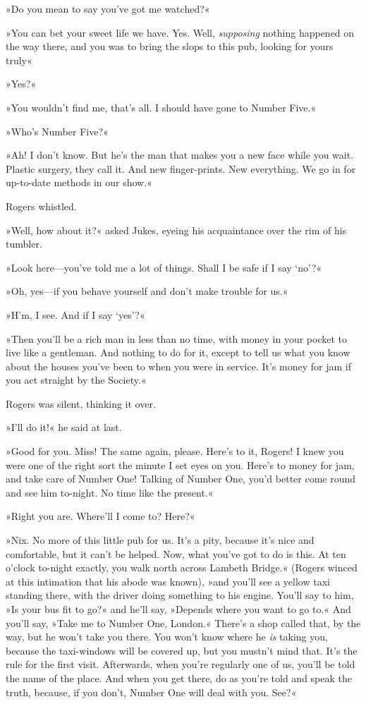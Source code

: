 »Do you mean to say you've got me watched?«

»You can bet your sweet life we have. Yes. Well, \textit{supposing} nothing happened on the way there, and you was to bring the slops to this pub, looking for yours truly\longdash«

»Yes?«

»You wouldn't find me, that's all. I should have gone to Number Five.«

»Who's Number Five?«

»Ah! I don't know. But he's the man that makes you a new face while you wait. Plastic surgery, they call it. And new finger-prints. New everything. We go in for up-to-date methods in our show.«

Rogers whistled.

»Well, how about it?« asked Jukes, eyeing his acquaintance over the rim of his tumbler.

»Look here—you've told me a lot of things. Shall I be safe if I say `no'?«

»Oh, yes—if you behave yourself and don't make trouble for us.«

»H'm, I see. And if I say `yes'?«

»Then you'll be a rich man in less than no time, with money in your pocket to live like a gentleman. And nothing to do for it, except to tell us what you know about the houses you've been to when you were in service. It's money for jam if you act straight by the Society.«

Rogers was silent, thinking it over.

»I'll do it!« he said at last.

»Good for you. Miss! The same again, please. Here's to it, Rogers! I knew you were one of the right sort the minute I set eyes on you. Here's to money for jam, and take care of Number One! Talking of Number One, you'd better come round and see him to-night. No time like the present.«

»Right you are. Where'll I come to? Here?«

»Nix. No more of this little pub for us. It's a pity, because it's nice and comfortable, but it can't be helped. Now, what you've got to do is this. At ten o'clock to-night exactly, you walk north across Lambeth Bridge.« (Rogers winced at this intimation that his abode was known), »and you'll see a yellow taxi standing there, with the driver doing something to his engine. You'll say to him, »Is your bus fit to go?« and he'll say, »Depends where you want to go to.« And you'll say, »Take me to Number One, London.« There's a shop called that, by the way, but he won't take you there. You won't know where he \textit{is} taking you, because the taxi-windows will be covered up, but you mustn't mind that. It's the rule for the first visit. Afterwards, when you're regularly one of us, you'll be told the name of the place. And when you get there, do as you're told and speak the truth, because, if you don't, Number One will deal with you. See?«

